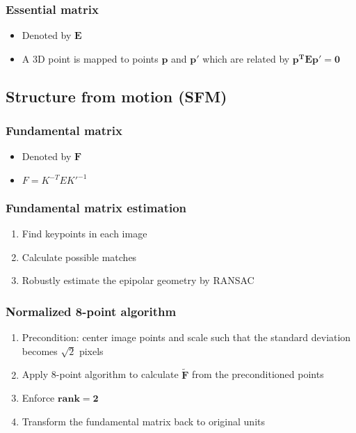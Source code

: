 \documentclass{article}
\begin{document}
        \subsubsection{Essential matrix}
        \begin{itemize}
            \item Denoted by $\mathbf{E}$
            \item A 3D point is mapped to points $\mathbf{p}$ and $\mathbf{p'}$ which are related by $\mathbf{p^T E p' = 0}$ 
        \end{itemize}

    \subsection{Structure from motion (SFM)}
    
        \subsubsection{Fundamental matrix}
        \begin{itemize}
            \item Denoted by $\mathbf{F}$
            \item $F = K^{-T} E K'^{-1}$
        \end{itemize}

        \subsubsection{Fundamental matrix estimation}
        \begin{enumerate}
            \item Find keypoints in each image
            \item Calculate possible matches
            \item Robustly estimate the epipolar geometry by RANSAC
        \end{enumerate}
    
        \subsubsection{Normalized 8-point algorithm}
        \begin{enumerate}
            \item Precondition: center image points and scale such that the standard deviation becomes $\sqrt{2}$ pixels
            \item Apply 8-point algorithm to calculate $\mathbf{\tilde{F}}$ from the preconditioned points
            \item Enforce $\mathbf{\textbf{rank}=2}$
            \item Transform the fundamental matrix back to original units
        \end{enumerate}
\end{document}
